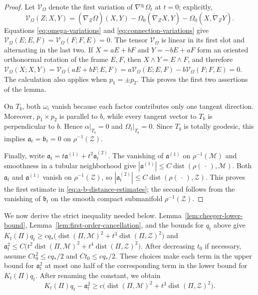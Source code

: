 \documentclass[11pt]{article}
\theoremstyle{definition}
\theoremstyle{remark}
\newcommand{\cM}{\mathcal M}
\newcommand{\cZ}{\mathcal Z}
\newcommand{\dist}{\operatorname{dist}}
\begin{document}
\begin{proof}
Let $\mathcal V_\Omega$ denote the first variation of
$\nabla^{g_t}\Omega_t$ at $t=0$; explicitly,
\[
 \mathcal V_\Omega(Z;X,Y)=(\nabla_Z\dot\Omega)(X,Y)
 -\Omega_0(\dot{\nabla}_Z X,Y)-\Omega_0(X,\dot{\nabla}_Z Y).
\]
Equations \eqref{eq:omega-variations} and \eqref{eq:connection-variations} give
$\mathcal V_\Omega(E;E,F)=\mathcal V_\Omega(F;F,E)=0$.
The tensor $\mathcal V_\Omega$ is linear in its first slot and alternating in the last two.
If $X=aE+bF$ and $Y=-bE+aF$ form an oriented orthonormal rotation
of the frame $E,F$, then $X\wedge Y=E\wedge F$, and therefore
$\mathcal V_\Omega(X;X,Y)=\mathcal V_\Omega(aE+bF;E,F)
=a\mathcal V_\Omega(E;E,F)-b\mathcal V_\Omega(F;F,E)=0$.
The calculation also applies when $p_1=\pm p_2$.  This proves the first two
assertions of the lemma.

On $T_b$, both $\omega_i$ vanish because each factor contributes only
one tangent direction.  Moreover, $p_1\times p_2$ is parallel to $b$,
while every tangent vector to $T_b$ is perpendicular to $b$.  Hence
$\alpha|_{T_b}=0$ and $\Omega_t|_{T_b}=0$.  Since $T_b$ is totally geodesic,
this implies $\mathfrak a_t=\mathfrak b_t=0$ on $\rho^{-1}(\cZ)$.

Finally, write
$\mathfrak a_t=t\mathfrak a^{(1)}+t^2\mathfrak a^{(2)}_t$.
The vanishing of $\mathfrak a^{(1)}$ on $\rho^{-1}(\cM)$ and smoothness in a
tubular neighborhood give
$|\mathfrak a^{(1)}|\leq C\dist(\rho(\,\cdot\,),\cM)$.  Both
$\mathfrak a_t$ and $\mathfrak a^{(1)}$ vanish on
$\rho^{-1}(\cZ)$, so
$|\mathfrak a^{(2)}_t|\leq C\dist(\rho(\,\cdot\,),\cZ)$.  This proves the
first estimate in \eqref{eq:a-b-distance-estimates}; the second follows from
the vanishing of $\mathfrak b_t$ on the smooth compact submanifold
$\rho^{-1}(\cZ)$.
\end{proof}

We now derive the strict inequality needed below.
Lemma~\ref{lem:cheeger-lower-bound}, Lemma~\ref{lem:first-order-cancellation},
and the bounds for $q_t$ above give
$K_t(\Pi)q_t\geq cq_*\bigl(\dist(\Pi,\cM)^2
+t^3\dist(\Pi,\cZ)^2\bigr)$ and
$\mathfrak a_t^2\leq C\bigl(t^2\dist(\Pi,\cM)^2
+t^4\dist(\Pi,\cZ)^2\bigr)$.  After decreasing $t_0$ if necessary, assume
$Ct_0^2\leq cq_*/2$ and $Ct_0\leq cq_*/2$.  These choices make each term in
the upper bound for $\mathfrak a_t^2$ at most one half of the corresponding
term in the lower bound for $K_t(\Pi)q_t$.  After renaming the constant, we obtain
\begin{equation}                                                                    \label{eq:base-strict-inequality}
 K_t(\Pi)q_t-\mathfrak a_t^2
 \geq c\bigl(\dist(\Pi,\cM)^2+t^3\dist(\Pi,\cZ)^2\bigr).
\end{equation}
\end{document}
